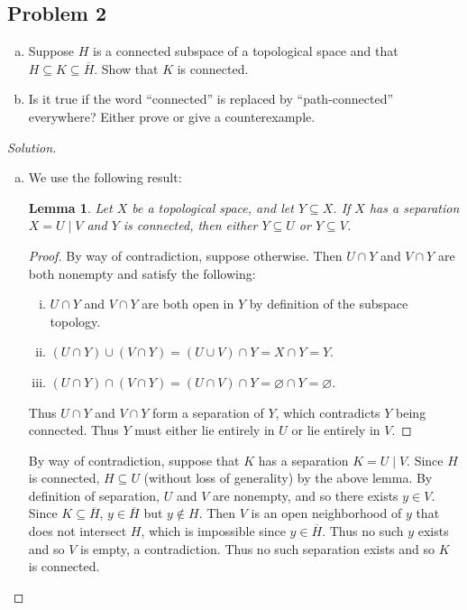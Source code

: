 \documentclass[12pt]{article}
\newcommand\paren[1]{\left( #1 \right)}
\newtheorem{lemma}[theorem]{Lemma}
\theoremstyle{definition}
\begin{document}
\subsection{Problem 2 \texorpdfstring{\cite{Munkres}}{}}
\begin{enumerate}[a)]
    \item Suppose $H$ is a connected subspace of a topological space and that $H \subseteq K \subseteq \overline{H}$. Show that $K$ is connected.
    \item Is it true if the word ``connected'' is replaced by ``path-connected'' everywhere? Either prove or give a counterexample.
\end{enumerate}
\begin{proof}[Solution]
    \noindent
    \begin{enumerate}[a)]
        \item We use the following result:
        \begin{lemma}
            Let $X$ be a topological space, and let $Y \subseteq X$. If $X$ has a separation $X = U \mid V$ and $Y$ is connected, then either $Y \subseteq U$ or $Y \subseteq V$.
        \end{lemma}
        \begin{proof}
            By way of contradiction, suppose otherwise. Then $U \cap Y$ and $V \cap Y$ are both nonempty and satisfy the following:
            \begin{enumerate}[(i)]
                \item $U \cap Y$ and $V \cap Y$ are both open in $Y$ by definition of the subspace topology.
                \item $\paren{U \cap Y} \cup \paren{V \cap Y} = \paren{U \cup V} \cap Y = X \cap Y = Y$.
                \item $\paren{U \cap Y} \cap \paren{V \cap Y} = \paren{U \cap V} \cap Y = \varnothing \cap Y = \varnothing$.
            \end{enumerate}
            Thus $U \cap Y$ and $V \cap Y$ form a separation of $Y$, which contradicts $Y$ being connected. Thus $Y$ must either lie entirely in $U$ or lie entirely in $V$.
        \end{proof}
        By way of contradiction, suppose that $K$ has a separation $K = U \mid V$. Since $H$ is connected, $H \subseteq U$ (without loss of generality) by the above lemma. By definition of separation, $U$ and $V$ are nonempty, and so there exists $y \in V$. Since $K \subseteq \overline{H}$, $y \in \overline{H}$ but $y \notin H$. Then $V$ is an open neighborhood of $y$ that does not intersect $H$, which is impossible since $y \in \overline{H}$. Thus no such $y$ exists and so $V$ is empty, a contradiction. Thus no such separation exists and so $K$ is connected.
        

\end{enumerate}
\end{proof}
\end{document}
